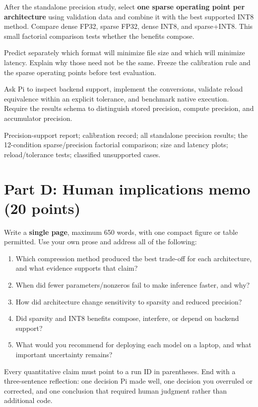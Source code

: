 \documentclass[11pt,letterpaper]{article}
\begin{document}
After the standalone precision study, select \textbf{one sparse operating point per architecture} using validation data and combine it with the best supported INT8 method. Compare dense FP32, sparse FP32, dense INT8, and sparse+INT8. This small factorial comparison tests whether the benefits compose.

\begin{humanbox}
Predict separately which format will minimize file size and which will minimize latency. Explain why those need not be the same. Freeze the calibration rule and the sparse operating points before test evaluation.
\end{humanbox}
\begin{agentbox}
Ask Pi to inspect backend support, implement the conversions, validate reload equivalence within an explicit tolerance, and benchmark native execution. Require the results schema to distinguish stored precision, compute precision, and accumulator precision.
\end{agentbox}
\begin{deliver}
Precision-support report; calibration record; all standalone precision results; the 12-condition sparse/precision factorial comparison; size and latency plots; reload/tolerance tests; classified unsupported cases.
\end{deliver}

\section{Part D: Human implications memo \texorpdfstring{\hfill}{} (20 points)}
Write a \textbf{single page}, maximum 650 words, with one compact figure or table permitted. Use your own prose and address all of the following:
\begin{enumerate}
 \item Which compression method produced the best trade-off for each architecture, and what evidence supports that claim?
 \item When did fewer parameters/nonzeros fail to make inference faster, and why?
 \item How did architecture change sensitivity to sparsity and reduced precision?
 \item Did sparsity and INT8 benefits compose, interfere, or depend on backend support?
 \item What would you recommend for deploying each model on a laptop, and what important uncertainty remains?
\end{enumerate}
Every quantitative claim must point to a run ID in parentheses. End with a three-sentence reflection: one decision Pi made well, one decision you overruled or corrected, and one conclusion that required human judgment rather than additional code.
\end{document}
